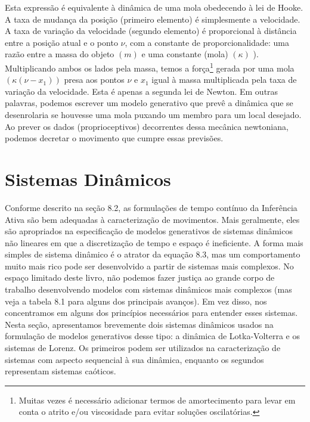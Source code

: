 \documentclass[
  12pt,
]{book}
\begin{document}
Esta expressão é equivalente à dinâmica de uma mola obedecendo à lei de Hooke. A taxa de mudança da posição (primeiro elemento) é simplesmente a velocidade. A taxa de variação da velocidade (segundo elemento) é proporcional à distância entre a posição atual e o ponto \(\nu\), com a constante de proporcionalidade: uma razão entre a massa do objeto \((m)\) e uma constante (mola) \((\kappa)\) ). Multiplicando ambos os lados pela massa, temos a força\footnote{Muitas vezes é necessário adicionar termos de amortecimento para levar em conta o atrito e/ou viscosidade para evitar soluções oscilatórias.} gerada por uma mola \((κ (\nu − x_1))\) presa aos pontos \(\nu\) e \(x_1\) igual à massa multiplicada pela taxa de variação da velocidade. Esta é apenas a segunda lei de Newton. Em outras palavras, podemos escrever um modelo generativo que prevê a dinâmica que se desenrolaria se houvesse uma mola puxando um membro para um local desejado. Ao prever os dados (proprioceptivos) decorrentes dessa mecânica newtoniana, podemos decretar o movimento que cumpre essas previsões.

\hypertarget{sistemas-dinuxe2micos}{%
\section{Sistemas Dinâmicos}\label{sistemas-dinuxe2micos}}

Conforme descrito na seção 8.2, as formulações de tempo contínuo da Inferência Ativa são bem adequadas à caracterização de movimentos. Mais geralmente, eles são apropriados na especificação de modelos generativos de sistemas dinâmicos não lineares em que a discretização de tempo e espaço é ineficiente. A forma mais simples de sistema dinâmico é o atrator da equação 8.3, mas um comportamento muito mais rico pode ser desenvolvido a partir de sistemas mais complexos. No espaço limitado deste livro, não podemos fazer justiça ao grande corpo de trabalho desenvolvendo modelos com sistemas dinâmicos mais complexos (mas veja a tabela 8.1 para alguns dos principais avanços). Em vez disso, nos concentramos em alguns dos princípios necessários para entender esses sistemas. Nesta seção, apresentamos brevemente dois sistemas dinâmicos usados \hspace{0pt}\hspace{0pt}na formulação de modelos generativos desse tipo: a dinâmica de Lotka-Volterra e os sistemas de Lorenz. Os primeiros podem ser utilizados na caracterização de sistemas com aspecto sequencial à sua dinâmica, enquanto os segundos representam sistemas caóticos.
\end{document}
